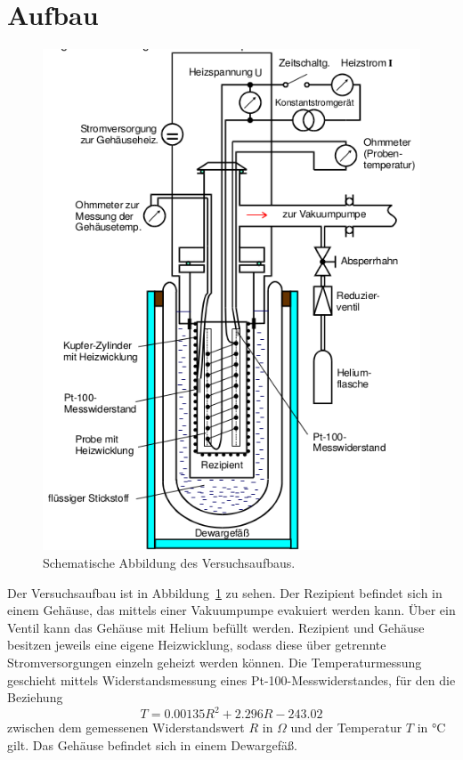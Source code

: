 \cite{FP}

\section{Aufbau}
\begin{figure}
\centering
\includegraphics[scale=0.5]{bilder/setup.png}
\caption{Schematische Abbildung des Versuchsaufbaus. \cite{FP}}
\label{fig:aufbau}
\end{figure}
Der Versuchsaufbau ist in Abbildung~\ref{fig:aufbau} zu sehen. Der
Rezipient befindet sich in einem Gehäuse, das mittels einer Vakuumpumpe
evakuiert werden kann. Über ein Ventil kann das Gehäuse mit Helium befüllt
werden. Rezipient und Gehäuse besitzen jeweils eine eigene Heizwicklung, sodass
diese über getrennte Stromversorgungen einzeln geheizt werden können. Die
Temperaturmessung geschieht mittels Widerstandsmessung eines Pt-100-Messwiderstandes,
für den die Beziehung
\begin{equation}
T = 0.00135 R^2 + 2.296 R -243.02
\label{eq:T_berechnung}
\end{equation}
zwischen dem gemessenen Widerstandswert $R$ in $\Omega$ und der Temperatur $T$ in
$\si{\celsius}$ gilt. Das Gehäuse befindet sich in einem Dewargefäß.
